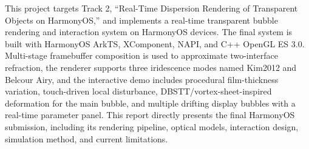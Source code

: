 

\begin{abstract}
  本项目面向【CCF CAD/CG 2026】高质量实时渲染技术挑战赛赛题二“基于鸿蒙的透明物体实时色散渲染系统”，实现了一个运行于 HarmonyOS 设备上的透明泡泡实时渲染与交互系统。系统采用 HarmonyOS ArkTS + XComponent + NAPI + C++ OpenGL ES 3.0 的整体架构，以屏幕空间折射为核心，通过多阶段 FBO 合成近似肥皂泡的双界面折射；在材质上实现了 Kim2012 的实时薄膜干涉计算模式以及 Belcour Airy 风格的多波长薄膜反射模式；在动态与交互上实现了基于噪声和排液趋势的膜厚变化、触摸驱动的局部扰动与波纹、主泡泡的 DBSTT/vortex sheet 表面形变，以及多展示泡泡的漂移组织与参数面板控制。本文按照渲染管线、光学模型、交互实现与动态模拟的顺序介绍最终初赛提交版本的系统设计、关键实现与局限。 
\end{abstract}

\begin{abstract*}
  This project targets Track 2, “Real-Time Dispersion Rendering of Transparent
  Objects on HarmonyOS,” and implements a real-time transparent bubble
  rendering and interaction system on HarmonyOS devices. The final system is
  built with HarmonyOS ArkTS, XComponent, NAPI, and C++ OpenGL ES 3.0.
  Multi-stage framebuffer composition is used to approximate two-interface
  refraction, the renderer supports three iridescence modes named Kim2012 and Belcour Airy, and the interactive demo includes
  procedural film-thickness variation, touch-driven local disturbance,
  DBSTT/vortex-sheet-inspired deformation for the main bubble, and multiple
  drifting display bubbles with a real-time parameter panel. This report
  directly presents the final HarmonyOS submission, including its rendering
  pipeline, optical models, interaction design, simulation method, and current
  limitations.
\end{abstract*}
